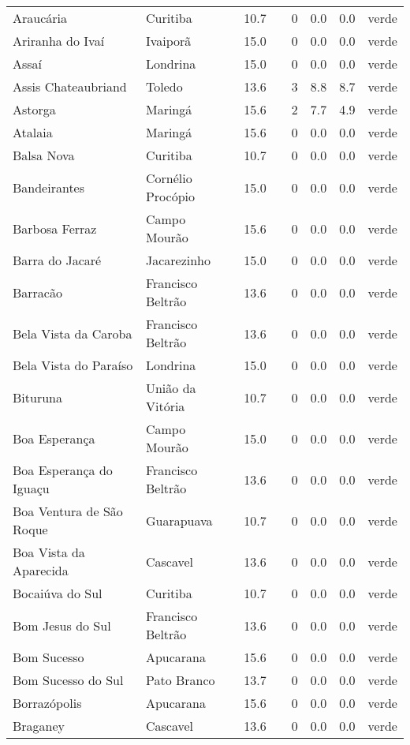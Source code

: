 \begin{longtable}{l|lllllll}
  Araucária & Curitiba & 10.7 &  & 0 & 0.0 & 0.0 & verde \\ 
  Ariranha do Ivaí & Ivaiporã & 15.0 &  & 0 & 0.0 & 0.0 & verde \\ 
  Assaí & Londrina & 15.0 &  & 0 & 0.0 & 0.0 & verde \\ 
  Assis Chateaubriand & Toledo & 13.6 &  & 3 & 8.8 & 8.7 & verde \\ 
  Astorga & Maringá & 15.6 &  & 2 & 7.7 & 4.9 & verde \\ 
  Atalaia & Maringá & 15.6 &  & 0 & 0.0 & 0.0 & verde \\ 
  Balsa Nova & Curitiba & 10.7 &  & 0 & 0.0 & 0.0 & verde \\ 
  Bandeirantes & Cornélio Procópio & 15.0 &  & 0 & 0.0 & 0.0 & verde \\ 
  Barbosa Ferraz & Campo Mourão & 15.6 &  & 0 & 0.0 & 0.0 & verde \\ 
  Barra do Jacaré & Jacarezinho & 15.0 &  & 0 & 0.0 & 0.0 & verde \\ 
  Barracão & Francisco Beltrão & 13.6 &  & 0 & 0.0 & 0.0 & verde \\ 
  Bela Vista da Caroba & Francisco Beltrão & 13.6 &  & 0 & 0.0 & 0.0 & verde \\ 
  Bela Vista do Paraíso & Londrina & 15.0 &  & 0 & 0.0 & 0.0 & verde \\ 
  Bituruna & União da Vitória & 10.7 &  & 0 & 0.0 & 0.0 & verde \\ 
  Boa Esperança & Campo Mourão & 15.0 &  & 0 & 0.0 & 0.0 & verde \\ 
  Boa Esperança do Iguaçu & Francisco Beltrão & 13.6 &  & 0 & 0.0 & 0.0 & verde \\ 
  Boa Ventura de São Roque & Guarapuava & 10.7 &  & 0 & 0.0 & 0.0 & verde \\ 
  Boa Vista da Aparecida & Cascavel & 13.6 &  & 0 & 0.0 & 0.0 & verde \\ 
  Bocaiúva do Sul & Curitiba & 10.7 &  & 0 & 0.0 & 0.0 & verde \\ 
  Bom Jesus do Sul & Francisco Beltrão & 13.6 &  & 0 & 0.0 & 0.0 & verde \\ 
  Bom Sucesso & Apucarana & 15.6 &  & 0 & 0.0 & 0.0 & verde \\ 
  Bom Sucesso do Sul & Pato Branco & 13.7 &  & 0 & 0.0 & 0.0 & verde \\ 
  Borrazópolis & Apucarana & 15.6 &  & 0 & 0.0 & 0.0 & verde \\ 
  Braganey & Cascavel & 13.6 &  & 0 & 0.0 & 0.0 & verde \\ 

\end{longtable}
